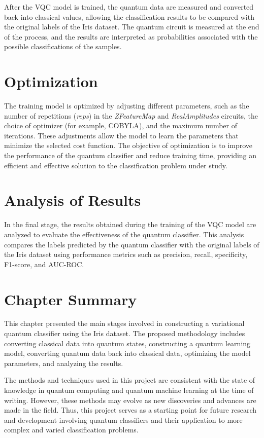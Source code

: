 After the VQC model is trained, the quantum data are measured and converted back into classical values, allowing the classification results to be compared with the original labels of the Iris dataset. The quantum circuit is measured at the end of the process, and the results are interpreted as probabilities associated with the possible classifications of the samples.

\section{Optimization}

The training model is optimized by adjusting different parameters, such as the number of repetitions (\textit{reps}) in the \textit{ZFeatureMap} and \textit{RealAmplitudes} circuits, the choice of optimizer (for example, COBYLA), and the maximum number of iterations. These adjustments allow the model to learn the parameters that minimize the selected cost function. The objective of optimization is to improve the performance of the quantum classifier and reduce training time, providing an efficient and effective solution to the classification problem under study.

\section{Analysis of Results}

In the final stage, the results obtained during the training of the VQC model are analyzed to evaluate the effectiveness of the quantum classifier. This analysis compares the labels predicted by the quantum classifier with the original labels of the Iris dataset using performance metrics such as precision, recall, specificity, F1-score, and AUC-ROC.

\section{Chapter Summary}

This chapter presented the main stages involved in constructing a variational quantum classifier using the Iris dataset. The proposed methodology includes converting classical data into quantum states, constructing a quantum learning model, converting quantum data back into classical data, optimizing the model parameters, and analyzing the results.

The methods and techniques used in this project are consistent with the state of knowledge in quantum computing and quantum machine learning at the time of writing. However, these methods may evolve as new discoveries and advances are made in the field. Thus, this project serves as a starting point for future research and development involving quantum classifiers and their application to more complex and varied classification problems.